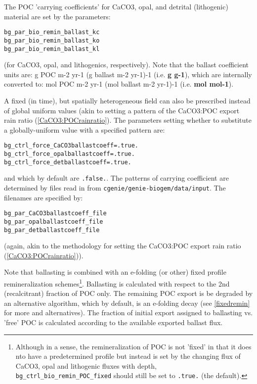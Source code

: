 \documentclass[10pt,twoside]{article}
\begin{document}
The POC 'carrying coefficients' for CaCO3, opal, and detrital (lithogenic) material are set by the parameters:
\vspace{-10pt}\begin{verbatim}
bg_par_bio_remin_ballast_kc
bg_par_bio_remin_ballast_ko
bg_par_bio_remin_ballast_kl
\end{verbatim}\vspace{-10pt}
(for CaCO3, opal, and lithogenics, respectively). Note that the ballast coefficient units are: g POC m-2 yr-1 (g ballast m-2 yr-1)-1 (i.e. \textbf{g g-1}), which are internally converted to: mol POC m-2 yr-1 (mol ballast m-2 yr-1)-1 (i.e. \textbf{mol mol-1}).

A fixed (in time), but spatially heterogeneous field can also be prescribed instead of global uniform values (akin to setting a pattern of the CaCO3:POC export rain ratio (\ref{CaCO3:POCrainratio}). The parameters setting whether to substitute a globally-uniform value with a specified pattern are:
\vspace{-10pt}\begin{verbatim}
bg_ctrl_force_CaCO3ballastcoeff=.true.
bg_ctrl_force_opalballastcoeff=.true.
bg_ctrl_force_detballastcoeff=.true.
\end{verbatim}\vspace{-10pt}
and which by default are \texttt{.false.}.
The patterns of carrying coefficient are determined by files read in from \texttt{cgenie\slash genie-biogem\slash data\slash input}. The filenames are specified by:
\vspace{-10pt}\begin{verbatim}
bg_par_CaCO3ballastcoeff_file
bg_par_opalballastcoeff_file
bg_par_detballastcoeff_file
\end{verbatim}\vspace{-10pt}
(again, akin to the methodology for setting the CaCO3:POC export rain ratio (\ref{CaCO3:POCrainratio})).

Note that ballasting is combined with an e-folding (or other) fixed profile remineralization schemes\footnote{Although in a sense, the remineralization of POC is not 'fixed' in that it does nto have a predetermined profile but instead is set by the changing flux of CaCO3, opal and lithogenic fluxes with depth, \texttt{bg\_ctrl\_bio\_remin\_POC\_fixed} should still be set to \texttt{.true.} (the default).}. Ballasting is calculated with respect to the 2nd (recalcitrant) fraction of POC only. The remaining POC export is be degraded by an alternative algorithm, which by default, is an e-folding decay (see \ref{fixedremin} for more and alternatives). The fraction of initial export assigned to ballasting vs. 'free' POC is calculated according to the available exported ballast flux.
\end{document}

